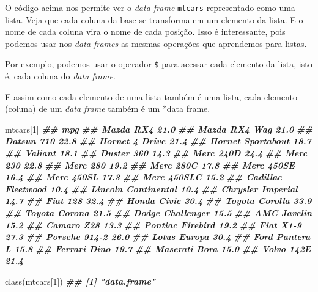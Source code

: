 \documentclass[
]{book}
\newenvironment{Shaded}{\begin{snugshade}}{\end{snugshade}}
\newcommand{\DecValTok}[1]{\textcolor[rgb]{0.00,0.00,0.81}{#1}}
\newcommand{\DocumentationTok}[1]{\textcolor[rgb]{0.56,0.35,0.01}{\textbf{\textit{#1}}}}
\newcommand{\FunctionTok}[1]{\textcolor[rgb]{0.00,0.00,0.00}{#1}}
\newcommand{\NormalTok}[1]{#1}
\newcommand{\SpecialCharTok}[1]{\textcolor[rgb]{0.00,0.00,0.00}{#1}}
\begin{document}
O código acima nos permite ver o \emph{data frame} \texttt{mtcars} representado como uma lista. Veja que cada coluna da base se transforma em um elemento da lista. E o nome de cada coluna vira o nome de cada posição. Isso é interessante, pois podemos usar nos \emph{data frames} as mesmas operações que aprendemos para listas.

Por exemplo, podemos usar o operador \texttt{\$} para acessar cada elemento da lista, isto é, cada coluna do \emph{data frame}.

\begin{Shaded}
\end{Shaded}

E assim como cada elemento de uma lista também é uma lista, cada elemento (coluna) de um \emph{data frame} também é um *data frame.

\begin{Shaded}
\begin{Highlighting}[]
\NormalTok{mtcars[}\DecValTok{1}\NormalTok{]}
\DocumentationTok{\#\#                      mpg}
\DocumentationTok{\#\# Mazda RX4           21.0}
\DocumentationTok{\#\# Mazda RX4 Wag       21.0}
\DocumentationTok{\#\# Datsun 710          22.8}
\DocumentationTok{\#\# Hornet 4 Drive      21.4}
\DocumentationTok{\#\# Hornet Sportabout   18.7}
\DocumentationTok{\#\# Valiant             18.1}
\DocumentationTok{\#\# Duster 360          14.3}
\DocumentationTok{\#\# Merc 240D           24.4}
\DocumentationTok{\#\# Merc 230            22.8}
\DocumentationTok{\#\# Merc 280            19.2}
\DocumentationTok{\#\# Merc 280C           17.8}
\DocumentationTok{\#\# Merc 450SE          16.4}
\DocumentationTok{\#\# Merc 450SL          17.3}
\DocumentationTok{\#\# Merc 450SLC         15.2}
\DocumentationTok{\#\# Cadillac Fleetwood  10.4}
\DocumentationTok{\#\# Lincoln Continental 10.4}
\DocumentationTok{\#\# Chrysler Imperial   14.7}
\DocumentationTok{\#\# Fiat 128            32.4}
\DocumentationTok{\#\# Honda Civic         30.4}
\DocumentationTok{\#\# Toyota Corolla      33.9}
\DocumentationTok{\#\# Toyota Corona       21.5}
\DocumentationTok{\#\# Dodge Challenger    15.5}
\DocumentationTok{\#\# AMC Javelin         15.2}
\DocumentationTok{\#\# Camaro Z28          13.3}
\DocumentationTok{\#\# Pontiac Firebird    19.2}
\DocumentationTok{\#\# Fiat X1{-}9           27.3}
\DocumentationTok{\#\# Porsche 914{-}2       26.0}
\DocumentationTok{\#\# Lotus Europa        30.4}
\DocumentationTok{\#\# Ford Pantera L      15.8}
\DocumentationTok{\#\# Ferrari Dino        19.7}
\DocumentationTok{\#\# Maserati Bora       15.0}
\DocumentationTok{\#\# Volvo 142E          21.4}

\FunctionTok{class}\NormalTok{(mtcars[}\DecValTok{1}\NormalTok{])}
\DocumentationTok{\#\# [1] "data.frame"}
\end{Highlighting}
\end{Shaded}
\end{document}
